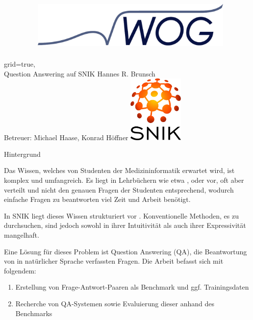 \documentclass[portrait,final,a0paper,fontscale=0.320]{imiseposter}
\begin{document}
\begin{poster}%
  {grid=true,}
  {\includegraphics[height=4.5cm, width=10cm, keepaspectratio]{img/logos/wog-logo-ohne-text.pdf}} 
  {Question Answering auf SNIK}
  {Hannes R. Brunsch\\
  Betreuer: Michael Haase, Konrad H{\"o}ffner}
  {\includegraphics[height=9.0em]{img/logos/snik-logo.png}}

\begin{posterbox}[name=background,column=0,row=0]{Hintergrund}

Das Wissen, welches von Studenten der Medizininformatik erwartet wird, ist komplex und umfangreich.
Es liegt in Lehrbüchern wie etwa \cite{bb}, \cite{ob} oder \cite{he} vor, oft aber verteilt und nicht den genauen Fragen der Studenten entsprechend,
wodurch einfache Fragen zu beantworten viel Zeit und Arbeit benötigt.

In SNIK liegt dieses Wissen strukturiert vor \cite{snik}.
Konventionelle Methoden, es zu durchsuchen, sind jedoch sowohl in ihrer Intuitivität als auch ihrer Expressivität mangelhaft.

Eine Lösung für dieses Problem ist Question Answering (QA), die Beantwortung von in natürlicher Sprache verfassten Fragen.
Die Arbeit befasst sich mit folgendem:
\begin{enumerate}
  \item Erstellung von Frage-Antwort-Paaren als Benchmark und ggf. Trainingsdaten
  \item Recherche von QA-Systemen sowie Evaluierung dieser anhand des Benchmarks
\end{enumerate}


\end{posterbox}
\end{poster}
\end{document}
